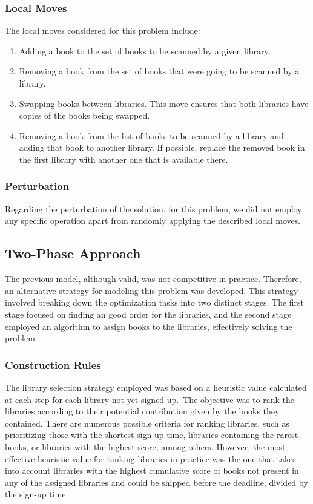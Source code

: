 \subsubsection*{Local Moves}

The local moves considered for this problem include:

\begin{enumerate}
  \item Adding a book to the set of books to be scanned by a given library.
  \item Removing a book from the set of books that were going to be scanned by a
        library.
  \item Swapping books between libraries. This move ensures that both libraries
        have copies of the books being swapped.
  \item Removing a book from the list of books to be scanned by a library and
        adding that book to another library. If possible, replace the removed book in
        the first library with another one that is available there.
\end{enumerate}

\subsubsection*{Perturbation}

Regarding the perturbation of the solution, for this problem, we did not employ
any specific operation apart from randomly applying the described local moves.

\subsection{Two-Phase Approach}

The previous model, although valid, was not competitive in practice. Therefore,
an alternative strategy for modeling this problem was developed. This strategy
involved breaking down the optimization tasks into two distinct stages. The
first stage focused on finding an good order for the libraries, and the second
stage employed an algorithm to assign books to the libraries, effectively
solving the problem.

\subsubsection*{Construction Rules}

The library selection strategy employed was based on a heuristic value
calculated at each step for each library not yet signed-up.~The objective was to
rank the libraries according to their potential contribution given by the books
they contained. There are numerous possible criteria for ranking libraries, such
as prioritizing those with the shortest sign-up time, libraries containing the
rarest books, or libraries with the highest score, among others. However, the
most effective heuristic value for ranking libraries in practice was the one
that takes into account libraries with the highest cumulative score of books not
present in any of the assigned libraries and could be shipped before the
deadline, divided by the sign-up time.

